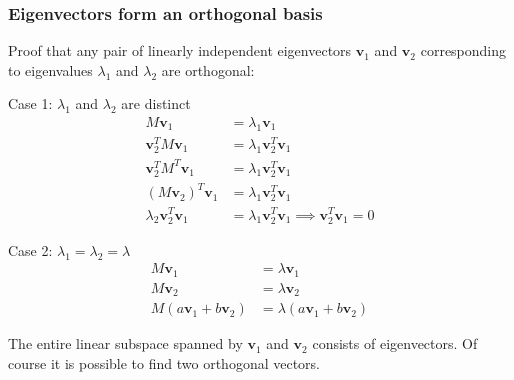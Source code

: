 \documentclass[8pt]{beamer}
\begin{document}
\begin{frame}
\frametitle{Eigenvectors form an orthogonal basis}

Proof that any pair of linearly independent eigenvectors $\mathbf{v}_1$ and $\mathbf{v}_2$ corresponding to eigenvalues $\lambda_1$ and $\lambda_2$ are orthogonal:

\begin{block}{Case 1: $\lambda_1$ and $\lambda_2$ are distinct}
\begin{align*}
    M \mathbf{v}_1 &= \lambda_1 \mathbf{v}_1 \\
    \mathbf{v}_2^T M \mathbf{v}_1 &=  \lambda_1 \mathbf{v}_2^T \mathbf{v}_1 \\
    \mathbf{v}_2^T M^T \mathbf{v}_1 &= \lambda_1 \mathbf{v}_2^T \mathbf{v}_1 \\
    (M \mathbf{v}_2)^T \mathbf{v}_1 &= \lambda_1 \mathbf{v}_2^T \mathbf{v}_1 \\
    \lambda_2 \mathbf{v}_2^T \mathbf{v}_1 &= \lambda_1 \mathbf{v}_2^T \mathbf{v}_1 \implies \mathbf{v}_2^T \mathbf{v}_1 = 0
\end{align*}
\end{block}

\begin{block}{Case 2: $\lambda_1 = \lambda_2 = \lambda$}
\begin{align*}
    M \mathbf{v}_1 &= \lambda \mathbf{v}_1 \\
    M \mathbf{v}_2 &= \lambda \mathbf{v}_2 \\
    M (a \mathbf{v}_1 + b \mathbf{v}_2) &= \lambda (a \mathbf{v}_1 + b \mathbf{v}_2 )
\end{align*}

The entire linear subspace spanned by $\mathbf{v}_1$ and $\mathbf{v}_2$ consists of eigenvectors. Of course it is possible to find two orthogonal vectors.
\end{block}

\end{frame}
\end{document}
